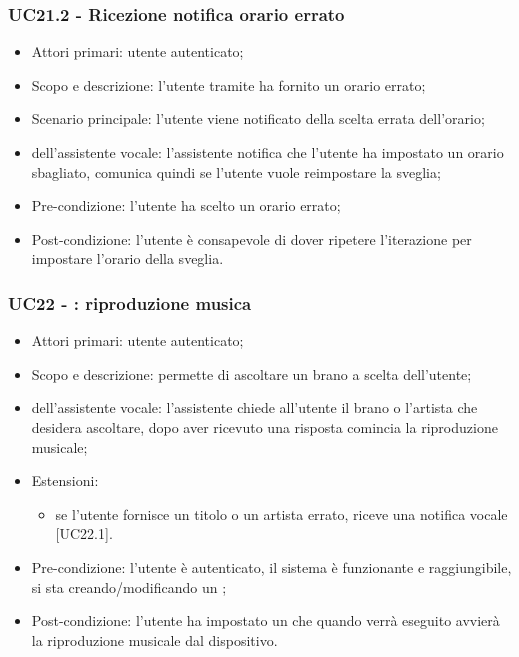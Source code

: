 \subsubsection{UC21.2 - Ricezione notifica orario errato}
\begin{itemize}
	\item  Attori primari: utente autenticato;
	\item  Scopo e descrizione: l'utente tramite  ha fornito un orario errato;
	\item  Scenario principale: l'utente viene notificato della scelta errata dell'orario;
	\item  {} dell'assistente vocale: l'assistente notifica che l'utente ha impostato un orario sbagliato, comunica quindi se l'utente vuole reimpostare la sveglia;
	\item  Pre-condizione: l'utente ha scelto un orario errato;
	\item  Post-condizione: l'utente è consapevole di dover ripetere l'iterazione per impostare l'orario della sveglia.
\end{itemize}
\subsubsection{UC22 - : riproduzione musica}
\begin{itemize}
	\item  Attori primari: utente autenticato;
	\item  Scopo e descrizione: permette di ascoltare un brano a scelta dell'utente;
	\item  {} dell'assistente vocale: l'assistente chiede all'utente il brano o l'artista che desidera ascoltare, dopo aver ricevuto una risposta comincia la riproduzione musicale;
	\item  Estensioni:
		   \begin{itemize}
				\item se l'utente fornisce un titolo o un artista errato, riceve una notifica vocale [UC22.1].
		   \end{itemize}
	\item  Pre-condizione: l'utente è autenticato, il sistema è funzionante e raggiungibile, si sta creando/modificando un ;
	\item  Post-condizione: l'utente ha impostato un  che quando verrà eseguito avvierà la riproduzione musicale dal dispositivo.
\end{itemize}
